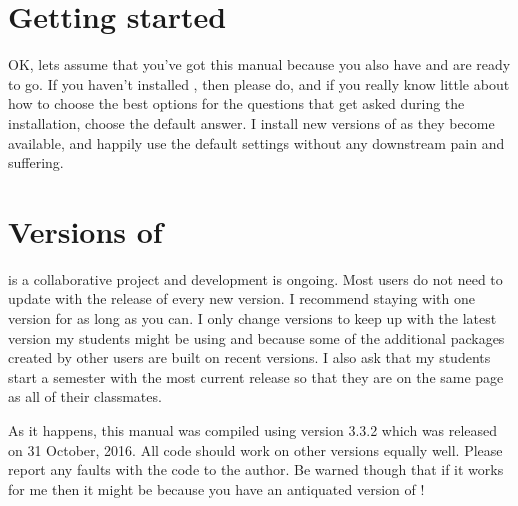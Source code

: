 \section{Getting started} 
 
OK, lets assume that you've got this manual because you also have \R{} and are ready to go. If you haven't installed \R{}, then please do, and if you really know little about how to choose the best options for the questions that get asked during the installation, choose the default answer. I install new versions of \R{} as they become available, and happily use the default settings without any downstream pain and suffering. 
 
\section{Versions of \R{}} 
 
\R{} is a collaborative project and development is ongoing. Most users do not need to update \R{} with the release of every new version. I recommend staying with one \R{} version for as long as you can. I only change versions to keep up with the latest version my students might be using and because some of the additional packages created by other \R{} users are built on recent versions.  I also ask that my students start a semester with the most current release so that they are on the same page as all of their classmates.

 
As it happens, this manual was compiled using version 3.3.2 which was released on 31 October, 2016. All code should work on other versions equally well. Please report any faults with the code to the author. Be warned though that if it works for me then it might be because you have an antiquated version of \R{}! 
 


